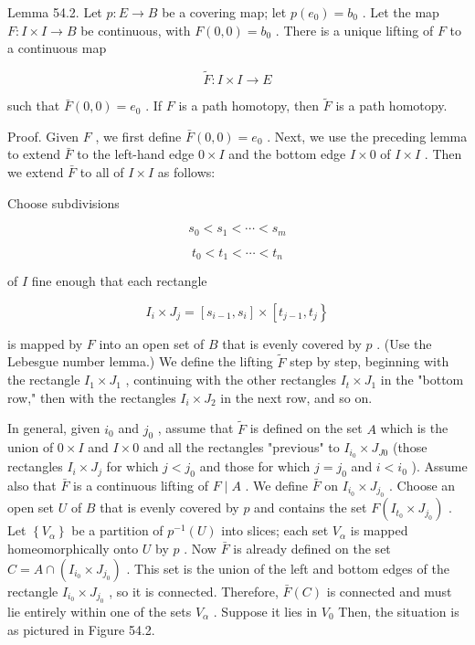 Lemma 54.2. Let \(p : E \rightarrow  B\) be a covering map; let \(p\left( {e}_{0}\right)  = {b}_{0}\) . Let the map \(F : I \times  I \rightarrow  B\) be continuous, with \(F\left( {0,0}\right)  = {b}_{0}\) . There is a unique lifting of \(F\) to a continuous map

\[
\widetilde{F} : I \times  I \rightarrow  E
\]

such that \(\bar{F}\left( {0,0}\right)  = {e}_{0}\) . If \(F\) is a path homotopy, then \(\widetilde{F}\) is a path homotopy.

Proof. Given \(F\) , we first define \(\bar{F}\left( {0,0}\right)  = {e}_{0}\) . Next, we use the preceding lemma to extend \(\bar{F}\) to the left-hand edge \(0 \times  I\) and the bottom edge \(I \times  0\) of \(I \times  I\) . Then we extend \(\bar{F}\) to all of \(I \times  I\) as follows:

Choose subdivisions

\[
{s}_{0} < {s}_{1} < \cdots  < {s}_{m}
\]

\[
{t}_{0} < {t}_{1} < \cdots  < {t}_{n}
\]

of \(I\) fine enough that each rectangle

\[
{I}_{i} \times  {J}_{j} = \left\lbrack  {{s}_{i - 1},{s}_{i}}\right\rbrack   \times  \left\lbrack  {{t}_{j - 1},{t}_{j}}\right\}
\]

is mapped by \(F\) into an open set of \(B\) that is evenly covered by \(p\) . (Use the Lebesgue number lemma.) We define the lifting \(\widetilde{F}\) step by step, beginning with the rectangle \({I}_{1} \times  {J}_{1}\) , continuing with the other rectangles \({I}_{t} \times  {J}_{1}\) in the "bottom row," then with the rectangles \({I}_{i} \times  {J}_{2}\) in the next row, and so on.

In general, given \({i}_{0}\) and \({j}_{0}\) , assume that \(\widetilde{F}\) is defined on the set \(A\) which is the union of \(0 \times  I\) and \(I \times  0\) and all the rectangles "previous" to \({I}_{{i}_{0}} \times  {J}_{J0}\) (those rectangles \({I}_{i} \times  {J}_{j}\) for which \(j < {j}_{0}\) and those for which \(j = {j}_{0}\) and \(i < {i}_{0}\) ). Assume also that \(\bar{F}\) is a continuous lifting of \(F \mid  A\) . We define \(\bar{F}\) on \({I}_{{i}_{0}} \times  {J}_{{j}_{0}}\) . Choose an open set \(U\) of \(B\) that is evenly covered by \(p\) and contains the set \(F\left( {{I}_{{t}_{0}} \times  {J}_{{j}_{0}}}\right)\) . Let \(\left\{  {V}_{\alpha }\right\}\) be a partition of \({p}^{-1}\left( U\right)\) into slices; each set \({V}_{\alpha }\) is mapped homeomorphically onto \(U\) by \(p\) . Now \(\bar{F}\) is already defined on the set \(C = A \cap  \left( {{I}_{{i}_{0}} \times  {J}_{{j}_{0}}}\right)\) . This set is the union of the left and bottom edges of the rectangle \({I}_{{i}_{0}} \times  {J}_{{j}_{0}}\) , so it is connected. Therefore, \(\bar{F}\left( C\right)\) is connected and must lie entirely within one of the sets \({V}_{\alpha }\) . Suppose it lies in \({V}_{0}\) Then, the situation is as pictured in Figure 54.2.

